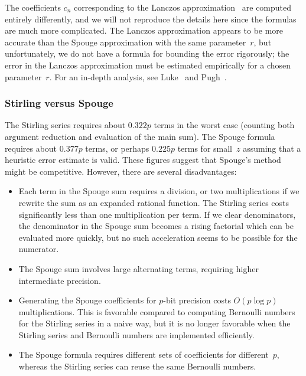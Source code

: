 \documentclass[reqno]{amsart}
\theoremstyle{definition}
\begin{document}
The coefficients $c_n$ corresponding to the Lanczos approximation~\cite{Lanczos1964}
are computed entirely differently, and
we will not reproduce the details here
since the formulas are much more complicated.
The Lanczos approximation appears to be more accurate
than the Spouge approximation with the same parameter~$r$,
but unfortunately, we do not have a formula
for bounding the error rigorously; the error in the Lanczos approximation must be estimated
empirically for a chosen parameter~$r$.
For an in-depth analysis, see Luke~\cite[p.\ 30]{luke1969special} and Pugh~\cite{pugh2004analysis}.

\subsubsection{Stirling versus Spouge}

The Stirling series requires about $0.322 p$ terms in the worst
case (counting both argument reduction and evaluation
of the main sum). The Spouge formula requires about $0.377 p$ terms,
or perhaps $0.225 p$ terms for small~$z$ assuming that a heuristic
error estimate is valid. These figures suggest that Spouge's method
might be competitive. However, there are several disadvantages:
\begin{itemize}
\item Each term in the Spouge sum requires a division,
or two multiplications if we rewrite the sum
as an expanded rational function.
The Stirling series
costs significantly less than one multiplication per term.
If we clear denominators, the denominator in the Spouge sum becomes
a rising factorial which can be evaluated more quickly,
but no such acceleration seems to be possible for the numerator.
\item The Spouge sum involves large alternating
terms, requiring higher intermediate precision.
\item Generating the Spouge coefficients for $p$-bit precision
costs $O(p \log p)$ multiplications. This is favorable compared
to computing Bernoulli numbers for the Stirling series in a naive way,
but it is no longer favorable when the
Stirling series and Bernoulli numbers are implemented efficiently.
\item The Spouge formula requires different sets of
coefficients for different~$p$,
whereas the Stirling series can reuse the same Bernoulli numbers.
\end{itemize}
\end{document}
